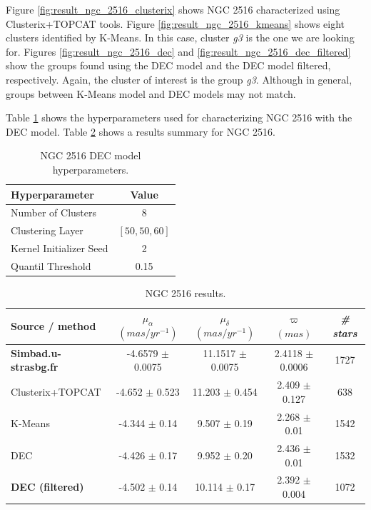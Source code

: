 \documentclass[11pt, a4paper, english]{book}
\begin{document}
\newpage

Figure \ref{fig:result_ngc_2516_clusterix} shows NGC 2516 characterized using Clusterix+TOPCAT tools.
Figure \ref{fig:result_ngc_2516_kmeans} shows eight clusters identified by K-Means.
In this case, cluster \emph{g3} is the one we are looking for.
Figures \ref{fig:result_ngc_2516_dec} and \ref{fig:result_ngc_2516_dec_filtered}
show the groups found using the DEC model and the DEC model filtered, respectively.
Again, the cluster of interest is the group \emph{g3}.
Although in general, groups between K-Means model and DEC models may not match.

Table \ref{tab:hyperparameters_ngc_2516} shows the hyperparameters used for characterizing NGC 2516
with the DEC model. Table \ref{tab:results_ngc_2516} shows a results summary for NGC 2516.

\vfill

\begin{table}[h]
  \begin{center}
    \begin{tabular}{l|c}
      \textbf{Hyperparameter} & \textbf{Value} \\
      \hline
      Number of Clusters & 8 \\
      Clustering Layer & $\left[ 50, 50, 60 \right]$ \\
      Kernel Initializer Seed & 2 \\
      Quantil Threshold & 0.15 \\
    \end{tabular}
    \caption{NGC 2516 DEC model hyperparameters.}
    \label{tab:hyperparameters_ngc_2516}
  \end{center}
\end{table}

\vfill

\begin{table}[h]
  \begin{center}
    \begin{tabular}{l|c|c|c|c}
      \textbf{Source / method} & \emph{$\mu_{\alpha}$ $(mas/yr^{-1})$} & \emph{$\mu_{\delta}$ $(mas/yr^{-1})$} & \emph{$\varpi$ $(mas)$} & \emph{\# stars} \\
      \hline
      \textbf{Simbad.u-strasbg.fr} & -4.6579 $\pm$ 0.0075 & 11.1517 $\pm$ 0.0075 & 2.4118 $\pm$ 0.0006 & 1727 \\
      Clusterix+TOPCAT & -4.652 $\pm$ 0.523 & 11.203 $\pm$ 0.454 & 2.409 $\pm$ 0.127 & 638 \\
      K-Means & -4.344 $\pm$ 0.14 & 9.507 $\pm$ 0.19 & 2.268 $\pm$ 0.01 & 1542 \\
      DEC & -4.426 $\pm$ 0.17 & 9.952 $\pm$ 0.20 & 2.436 $\pm$ 0.01 & 1532 \\
      \textbf{DEC (filtered)} & -4.502 $\pm$ 0.14 & 10.114 $\pm$ 0.17 & 2.392 $\pm$ 0.004 & 1072 \\
    \end{tabular}
    \caption{NGC 2516 results.}
    \label{tab:results_ngc_2516}
  \end{center}
\end{table}
\end{document}
